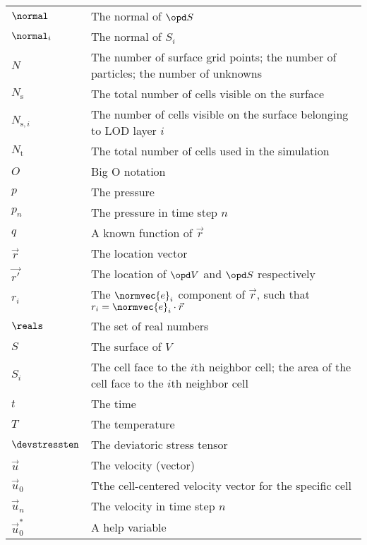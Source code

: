 \begin{center}
\begin{longtabu}{l X}
    $\normal$           & The normal of $\opd S$ \\
    $\normal_i$         & The normal of $S_i$ \\
    $N$                 & The number of surface grid points; the number of particles;
                          the number of unknowns \\
    $N_{\text{s}}$      & The total number of cells visible on the surface \\
    $N_{\text{s},i}$    & The number of cells visible on the surface belonging to LOD layer $i$ \\
    $N_{\text{t}}$      & The total number of cells used in the simulation \\
    $O$                 & Big O notation \\
    $p$                 & The pressure \\
    $p_n$               & The pressure in time step $n$ \\
    $q$                 & A known function of $\vec{r}$ \\
    $\vec{r}$           & The location vector \\
    $\vec{r'}$          & The location of $\opd V$ and $\opd S$ respectively \\
    $r_i$               & The $\normvec{e}_i$ component of $\vec{r}$,
                          such that $r_i = \normvec{e}_i\cdot\vec{r}$ \\
    $\reals$            & The set of real numbers \\
    $S$                 & The surface of $V$ \\
    $S_i$               & The cell face to the $i$th neighbor cell;
                          the area of the cell face to the $i$th neighbor cell \\
    $t$                 & The time \\
    $T$                 & The temperature \\
    $\devstressten$     & The deviatoric stress tensor \\
    $\vec{u}$           & The velocity (vector) \\
    $\vec{u}_0$         & Tthe cell-centered velocity vector for the specific cell \\
    $\vec{u}_n$         & The velocity in time step $n$ \\
    $\vec{u}_0^*$       & A help variable \\

\end{longtabu}
\end{center}
